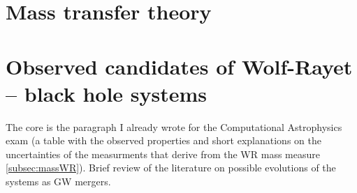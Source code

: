 \documentclass[a4paper,titlepage]{book}     	%
\begin{document}
\section{Mass transfer theory}\label{subsec:masstransfer}






\section{Observed candidates of Wolf-Rayet -- black hole systems}\label{sec:WRBHobserved}
The core is the paragraph I already wrote for the Computational Astrophysics exam (a table with the observed properties and short explanations on the uncertainties of the measurments that derive from the WR mass measure \ref{subsec:massWR}). Brief review of the literature on possible evolutions of the systems as GW mergers.\\
\end{document}
